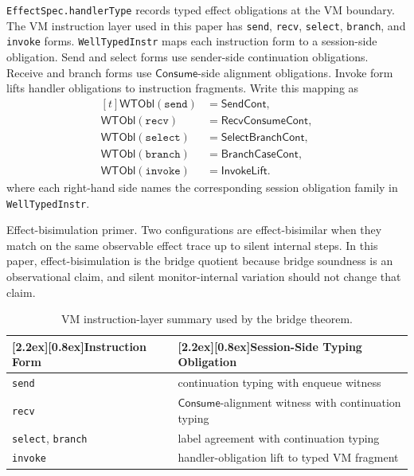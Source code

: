 \documentclass[a4paper,10pt,twocolumn,english]{article}
\numberwithin{equation}{section}
\theoremstyle{paperdef}
\theoremstyle{paperplain}
\theoremstyle{paperdef}
\theoremstyle{paperremark}
\newcommand{\thead}[1]{\textbf{\raisebox{0pt}[2.2ex][0.8ex]{#1}}}
\newcommand{\Consume}{\ensuremath{\mathsf{Consume}}}
\begin{document}
\texttt{EffectSpec.handlerType} records typed effect obligations at the VM boundary.
The VM instruction layer used in this paper has \texttt{send}, \texttt{recv}, \texttt{select},
\texttt{branch}, and \texttt{invoke} forms. \texttt{WellTypedInstr} maps each instruction form to a
session-side obligation. Send and select forms use sender-side continuation obligations. Receive and
branch forms use \Consume-side alignment obligations. Invoke form lifts handler obligations to instruction fragments.
Write this mapping as
\begin{equation}
	\begin{aligned}[t]
		\mathsf{WTObl}(\texttt{send})   & = \mathsf{SendCont},         \\
		\mathsf{WTObl}(\texttt{recv})   & = \mathsf{RecvConsumeCont},  \\
		\mathsf{WTObl}(\texttt{select}) & = \mathsf{SelectBranchCont}, \\
		\mathsf{WTObl}(\texttt{branch}) & = \mathsf{BranchCaseCont},   \\
		\mathsf{WTObl}(\texttt{invoke}) & = \mathsf{InvokeLift}.
	\end{aligned}
\end{equation}
where each right-hand side names the corresponding session obligation family in \texttt{WellTypedInstr}.

Effect-bisimulation primer. Two configurations are effect-bisimilar when they
match on the same observable effect trace up to silent internal steps. In this
paper, effect-bisimulation is the bridge quotient because bridge soundness is
an observational claim, and silent monitor-internal variation should not change
that claim.

\begin{table}[H]
	\centering
	\scriptsize
	\begin{tabularx}{\columnwidth}{@{}L{0.28\columnwidth}L{0.62\columnwidth}@{}}
		\toprule
		\thead{Instruction Form}         & \thead{Session-Side Typing Obligation}              \\
		\midrule
		\texttt{send}                    & continuation typing with enqueue witness            \\
		\texttt{recv}                    & \Consume-alignment witness with continuation typing \\
		\texttt{select}, \texttt{branch} & label agreement with continuation typing            \\
		\texttt{invoke}                  & handler-obligation lift to typed VM fragment        \\
		\bottomrule
	\end{tabularx}
	\caption{VM instruction-layer summary used by the bridge theorem.}
\end{table}
\end{document}
